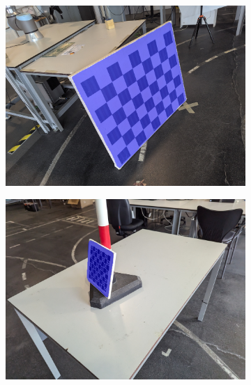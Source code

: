 \begin{figure}[h]
        \begin{subfigure}[b]{0.49\linewidth}
            \includegraphics[width=\textwidth]{resources/images/preds/Small_dataset_unet_resnet/pattern_58.jpg}
        \end{subfigure}
    \hfill
        \begin{subfigure}[b]{0.49\linewidth}
            \includegraphics[width=\textwidth]{resources/images/preds/Small_dataset_unet_resnet/pattern_61.jpg}
        \end{subfigure}
        \begin{subfigure}[b]{0.49\linewidth}

\end{subfigure}
\end{figure}
